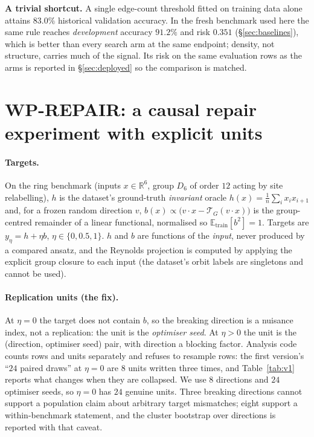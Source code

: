\documentclass[11pt]{article}
\newcommand{\Tg}{\mathcal{T}_G}
\begin{document}
\textbf{A trivial shortcut.} A single edge-count threshold fitted on training data alone
attains $83.0\%$ historical validation accuracy. In the fresh benchmark used here the same
rule reaches \emph{development} accuracy $91.2\%$ and risk $0.351$ (\S\ref{sec:baselines}),
which is better than every search arm at the same endpoint; density, not structure, carries
much of the signal. Its risk on the same evaluation rows as the arms is reported in
\S\ref{sec:deployed} so the comparison is matched.

\section{WP-REPAIR: a causal repair experiment with explicit units}
\label{sec:repair}

\paragraph{Targets.} On the ring benchmark (inputs $x\in\mathbb{R}^{6}$, group $D_6$ of
order $12$ acting by site relabelling), $h$ is the dataset's ground-truth \emph{invariant}
oracle $h(x)=\frac1n\sum_i x_i x_{i+1}$ and, for a frozen random direction $v$,
$b(x)\propto \bigl(v\!\cdot\!x-\Tg(v\!\cdot\!x)\bigr)$ is the group-centred remainder of a
linear functional, normalised so $\mathbb{E}_{\text{train}}[b^2]=1$. Targets are
$y_\eta=h+\eta b$, $\eta\in\{0,0.5,1\}$. $h$ and $b$ are functions of the \emph{input},
never produced by a compared ansatz, and the Reynolds projection is computed by applying
the explicit group closure to each input (the dataset's orbit labels are singletons and
cannot be used).

\paragraph{Replication units (the fix).} At $\eta=0$ the target does not contain $b$, so
the breaking direction is a nuisance index, not a replication: the unit is the
\emph{optimiser seed}. At $\eta>0$ the unit is the (direction, optimiser seed) pair, with
direction a blocking factor. Analysis code counts rows and units separately and refuses to
resample rows: the first version's ``$24$ paired draws'' at $\eta=0$ are $8$ units written
three times, and Table~\ref{tab:v1} reports what changes when they are collapsed. We use
$8$ directions and $24$ optimiser seeds, so $\eta=0$ has $24$ genuine units. Three
breaking directions cannot support a population claim about arbitrary target mismatches;
eight support a within-benchmark statement, and the cluster bootstrap over directions is
reported with that caveat.
\end{document}
